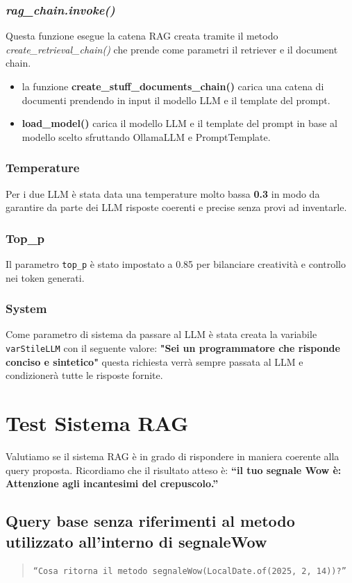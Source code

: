 \documentclass[12pt,a4paper,openright,twoside]{book}
\begin{document}
\subsubsection{\emph{rag\_chain.invoke()}}
 Questa funzione esegue la catena RAG creata tramite il metodo \emph{create\_retrieval\_chain()} che prende come parametri il retriever e il document chain.
 \begin{itemize}
    \item la funzione \textbf{create\_stuff\_documents\_chain()} carica una catena di documenti prendendo in input il modello LLM e il template del prompt.
    \item \textbf{load\_model()} carica il modello LLM e il template del prompt in base al modello scelto sfruttando OllamaLLM e PromptTemplate.
 \end{itemize}
 \subsubsection{Temperature}
Per i due LLM è stata data una temperature molto bassa \textbf{0.3} in modo da garantire da parte dei LLM risposte coerenti e precise senza provi ad inventarle.
\subsubsection{Top\_p}
Il parametro \texttt{top\_p} è stato impostato a 0.85 per bilanciare creatività e controllo nei token generati.
\subsubsection{System}
Come parametro di sistema da passare al LLM è stata creata la variabile \texttt{varStileLLM} con il seguente valore: \textbf{"Sei un programmatore che risponde conciso e sintetico"}
questa richiesta verrà sempre passata al LLM e condizionerà tutte le risposte fornite.

\section{Test Sistema RAG}
Valutiamo se il sistema RAG  è in grado di rispondere in maniera coerente alla query proposta.
Ricordiamo che il risultato atteso è: \textbf{``il tuo segnale Wow è: Attenzione agli incantesimi del crepuscolo.''}    
\subsection{Query base senza riferimenti al metodo utilizzato all'interno di segnaleWow}
\begin{quote}
    \texttt{``Cosa ritorna il metodo segnaleWow(LocalDate.of(2025, 2, 14))?''}
\end{quote}
\end{document}
